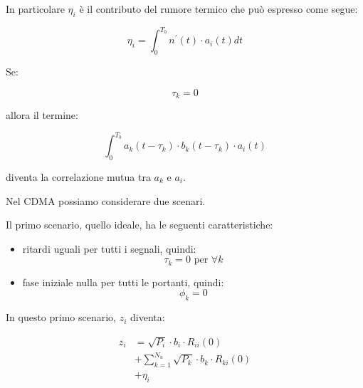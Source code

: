 In particolare $\eta_i$ è il contributo del rumore termico che può espresso come segue: 

{
    \Large 
    \begin{equation}
        \eta_i 
        = 
        \int_{0}^{T_b} 
        n^{'} (t) \cdot a_i (t) dt
    \end{equation}
}

Se: 

{
    \Large 
    \begin{equation}
        \tau_k = 0
    \end{equation}
}

allora il termine: 

{
    \Large 
    \begin{equation}
        \int_{0}^{T_b}
            a_k (t - \tau_k)
            \cdot
            b_k (t - \tau_k)
            \cdot 
            a_i (t) 
    \end{equation}
}

diventa la correlazione mutua tra $a_k$ e $a_i$. \newline 

Nel CDMA possiamo considerare due scenari. \newline 

Il primo scenario, quello ideale, 
ha le seguenti caratteristiche: 

\begin{itemize}
    \item ritardi uguali per tutti i segnali, quindi:
    {
        \Large
        \begin{equation}
            \tau_k = 0 \text{ per } \forall k
        \end{equation}
    }
    \item fase iniziale nulla per tutti le portanti, quindi: 
    {
        \Large 
        \begin{equation}
            \phi_k = 0
        \end{equation}
    }
\end{itemize}

In questo primo scenario, $z_i$ diventa: 

{
    \Large 
    \begin{equation}
        \begin{split}
        z_i 
        &=
        \sqrt{P_i} \cdot b_i \cdot R_{ii} (0) 
        \\
        &+ 
        \sum_{k = 1}^{N_u}
        \sqrt{P_k} \cdot b_k \cdot R_{ki} (0)
        \\
        &+ 
        \eta_i
        \end{split}
    \end{equation}
}

